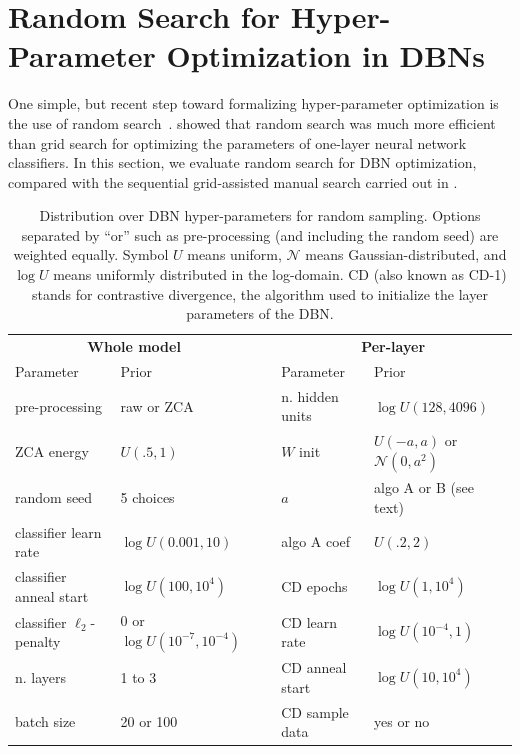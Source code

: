 \documentclass{article}
\newcommand{\algorandom}{random}
\newcommand{\vs}[1]{\vspace*{-#1mm}}
\newcommand{\Bs}{\vs{2}}
\newcommand{\as}{\vs{1}}
\renewcommand{\citet}{\cite}
\begin{document}
\Bs
\section{Random Search for Hyper-Parameter Optimization in DBNs}
\as
\label{sec:random}


One simple, but recent step toward formalizing hyper-parameter optimization is
the use of random search~\citet{Pinto-2009}.
\citet{Bergstra+Bengio:2011snowbird} showed that random search was much more
efficient than grid search for optimizing the parameters of one-layer neural
network classifiers.
In this section, we evaluate random search for DBN
optimization, compared with the sequential grid-assisted manual search
carried out in \citet{Larochelle+etal:2007}.


\begin{table}
\vs{4}
    \caption{Distribution over DBN hyper-parameters for random sampling.
    Options separated by ``or''  such as pre-processing (and including the random seed) are weighted equally.
    Symbol $U$ means uniform, $\mathcal{N}$ means Gaussian-distributed, and $\log U$ means uniformly distributed in the log-domain.
    CD (also known as CD-1) stands for contrastive divergence, the algorithm used to initialize the layer parameters of the DBN.
    }
    \label{tbl:dbnprior}
    \centering
    \begin{tabular}{llp{.1in}ll}
        \multicolumn{2}{c}{{\bf Whole model}} & & \multicolumn{2}{c}{\bf Per-layer} \\
        Parameter & Prior & & Parameter & Prior \\
        \hline
        pre-processing & raw or ZCA & & n. hidden units & $\log U(128, 4096)$\\
        ZCA energy & $U(.5, 1)$ & & $W$ init & $U(-a,a)$ or $\mathcal{N}(0, a^2)$ \\
        random seed & 5 choices & & $a$ & algo A or B (see text)\\
        classifier learn rate & $\log U(0.001, 10)$ & & algo A coef& $U(.2,2)$\\
        classifier anneal start & $\log U(100, 10^4)$ & & CD epochs & $\log U(1, 10^4)$\\
        classifier $\ell_2$-penalty & 0 or $\log U(10^{-7}, 10^{-4})$ & & CD learn rate & $\log U(10^{-4},1)$ \\
        n. layers & 1 to 3 & & CD anneal start & $\log U(10, 10^4)$ \\
        batch size & 20 or 100 & & CD sample data & yes or no \\
        \hline
    \end{tabular}
\vs{4}
\end{table}
\end{document}
